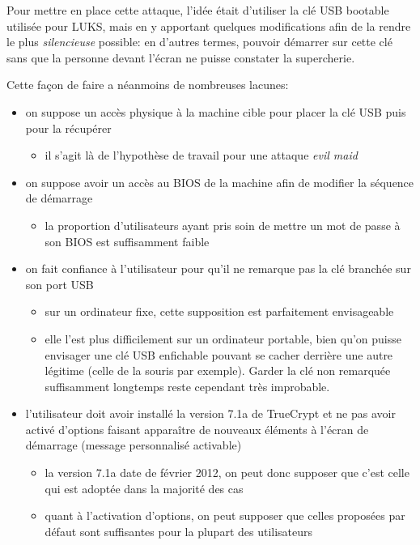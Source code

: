 \documentclass[12pt,a4paper]{article}
\begin{document}
Pour mettre en place cette attaque, l'idée était d'utiliser la clé USB bootable utilisée pour LUKS, mais en y apportant quelques modifications afin de la rendre le plus \textit{silencieuse} possible: en d'autres termes, pouvoir démarrer sur cette clé sans que la personne devant l'écran ne puisse constater la supercherie.

Cette façon de faire a néanmoins de nombreuses lacunes:
{
\renewcommand{\labelitemii}{$\Rightarrow$}
\begin{itemize}
	\item on suppose un accès physique à la machine cible pour placer la clé USB puis pour la récupérer
	\begin{itemize}
		\item il s'agit là de l'hypothèse de travail pour une attaque \textit{evil maid}
	\end{itemize}
	\item on suppose avoir un accès au BIOS de la machine afin de modifier la séquence de démarrage
	\begin{itemize}
		\item la proportion d'utilisateurs ayant pris soin de mettre un mot de passe à son BIOS est suffisamment faible
	\end{itemize}
	\item on fait confiance à l'utilisateur pour qu'il ne remarque pas la clé branchée sur son port USB
	\begin{itemize}
		\item sur un ordinateur fixe, cette supposition est parfaitement envisageable
		\item elle l'est plus difficilement sur un ordinateur portable, bien qu'on puisse envisager une clé USB enfichable pouvant se cacher derrière une autre légitime (celle de la souris par exemple). Garder la clé non remarquée suffisamment longtemps reste cependant très improbable.
	\end{itemize}
	\item l'utilisateur doit avoir installé la version 7.1a de TrueCrypt et ne pas avoir activé d'options faisant apparaître de nouveaux éléments à l'écran de démarrage (message personnalisé activable)
	\begin{itemize}
		\item la version 7.1a date de février 2012, on peut donc supposer que c'est celle qui est adoptée dans la majorité des cas
		\item quant à l'activation d'options, on peut supposer que celles proposées par défaut sont suffisantes pour la plupart des utilisateurs

\end{itemize}
\end{itemize}}
\end{document}
